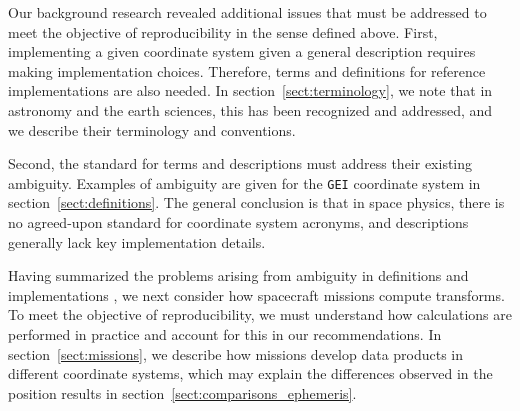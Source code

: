 \documentclass[draft]{agujournal2019}
\begin{document}
Our background research revealed additional issues that must be addressed to meet the objective of reproducibility in the sense defined above. First, implementing a given coordinate system given a general description requires making implementation choices. Therefore, terms and definitions for reference implementations are also needed. In section~\ref{sect:terminology}, we note that in astronomy and the earth sciences, this has been recognized and addressed, and we describe their terminology and conventions.

Second, the standard for terms and descriptions must address their existing ambiguity. Examples of ambiguity are given for the \texttt{GEI} coordinate system in section~\ref{sect:definitions}. The general conclusion is that in space physics, there is no agreed-upon standard for coordinate system acronyms, and descriptions generally lack key implementation details.




Having summarized the problems arising from ambiguity in definitions and implementations , we next consider how spacecraft missions compute transforms. To meet the objective of reproducibility, we must understand how calculations are performed in practice and account for this in our recommendations. In section~\ref{sect:missions}, we describe how missions develop data products in different coordinate systems, which may explain the differences observed in the position results in section~\ref{sect:comparisons_ephemeris}.
\end{document}
